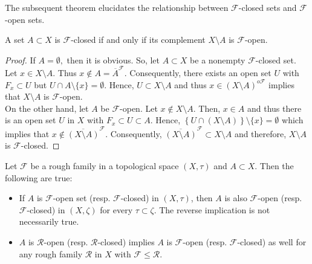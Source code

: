 \documentclass[11pt]{amsart}
\begin{document}
The subsequent theorem elucidates the relationship between $\mathscr{F}$-closed sets and $\mathscr{F}$-open sets.

\begin{theorem}\label{T6}
    A set $A\subset X$ is $\mathscr{F}$-closed if and only if its complement $X\setminus A$ is $\mathscr{F}$-open.
\end{theorem}

\begin{proof} If $A=\emptyset,$ then it is obvious. So, let $A\subset X$ be a nonempty $\mathscr{F}$-closed set.  Let $x\in X\setminus A.$ Thus $x\notin A=\overline{A}^\mathscr{F}.$ Consequently, there exists an open set $U$ with $F_x\subset U$ but $U\cap A\setminus\{x\}=\emptyset.$ Hence, $U\subset X\setminus A$ and thus $x\in (X\setminus A)^{o\mathscr{F}}$ implies that $X\setminus A$ is $\mathscr{F}$-open.\\

On the other hand, let $A$ be $\mathscr{F}$-open. Let $x\notin X\setminus A$. Then,  $x\in A$ and thus there is an open set $U$ in $X$ with $F_x\subset U\subset A$. Hence, $\left\{U\cap (X\setminus A)\right\}\setminus\{x\}=\emptyset$ which implies that $x\notin \overline{(X\setminus A)}^\mathscr{F}$. Consequently, $\overline{(X\setminus A)}^\mathscr{F}\subset X\setminus A$ and therefore, $X\setminus A$ is $\mathscr{F}$-closed.
\end{proof}


\begin{theorem}\label{Th3.7} Let $\mathscr{F}$ be a rough family in a topological space $(X,\tau)$ and $A\subset X$. Then the following are true: \begin{itemize}
    \item[(i)] If $A$ is $\mathscr{F}$-open set (resp. $\mathscr{F}$-closed) in $(X,\tau)$, then $A$ is also $\mathscr{F}$-open (resp. $\mathscr{F}$-closed) in $(X,\zeta)$ for every $\tau\subset \zeta$. The reverse implication is not necessarily true.

    \item[(ii)] $A$ is $\mathscr{R}$-open (resp. $\mathscr{R}$-closed) implies $A$ is $\mathscr{F}$-open (resp. $\mathscr{F}$-closed) as well for any rough family $\mathscr{R}$  in $X$ with $\mathscr{F}\leq \mathscr{R}$.
\end{itemize}
\end{theorem}
\end{document}
